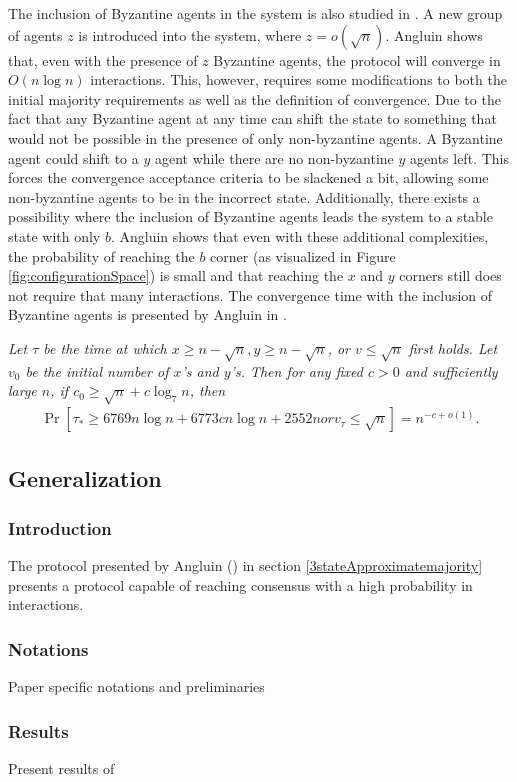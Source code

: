  The inclusion of Byzantine agents in the system is also studied in \cite{angluinSimplePopulationProtocol2008}. A new group of agents $z$ is introduced into the system, where $z = o(\sqrt{n})$. Angluin shows that, even with the presence of $z$ Byzantine agents, the protocol will converge in $O(n \log n)$ interactions. This, however, requires some modifications to both the initial majority requirements as well as the definition of convergence. Due to the fact that any Byzantine agent at any time can shift the state to something that would not be possible in the presence of only non-byzantine agents. A Byzantine agent could shift to a $y$ agent while there are no non-byzantine $y$ agents left. This forces the convergence acceptance criteria to be slackened a bit, allowing some non-byzantine agents to be in the incorrect state. Additionally, there exists a possibility where the inclusion of Byzantine agents leads the system to a stable state with only $b$. Angluin shows that even with these additional complexities, the probability of reaching the $b$ corner (as visualized in Figure \ref{fig:configurationSpace}) is small and that reaching the $x$ and $y$ corners still does not require that many interactions. The convergence time with the inclusion of Byzantine agents is presented by Angluin in .
 
 \begin{theorem}
    \textit{Let $\tau$ be the time at which $x \geq n - \sqrt{n}, y \geq n - \sqrt{n}$, or $v \leq \sqrt{n}$ first holds. Let $v_0$ be the initial number of $x$'s and $y$'s. Then for any fixed $c > 0$ and sufficiently large $n$, if $c_0 \geq \sqrt{n} + c \log_7n$, then}
    \begin{align}
        \Pr [ \tau_* \geq 6769n \log n + 6773 c n \log n + 2552n or v_{\tau} \leq \sqrt{n}] = n^{-c+o(1)}.  \label{angluinTheorem4} 
    \end{align}
 \end{theorem} 
 
\subsection{Generalization}

 \subsubsection{Introduction}
The protocol presented by Angluin (\cite{angluinSimplePopulationProtocol2008}) in section \ref{3stateApproximatemajority} presents a protocol capable of 
reaching consensus with a high probability in  interactions. 

\subsubsection{Notations}
Paper specific notations and preliminaries

\subsubsection{Results}
Present results of \cite{AspnesFastConverganceOfKOpinion2023}

\clearpage